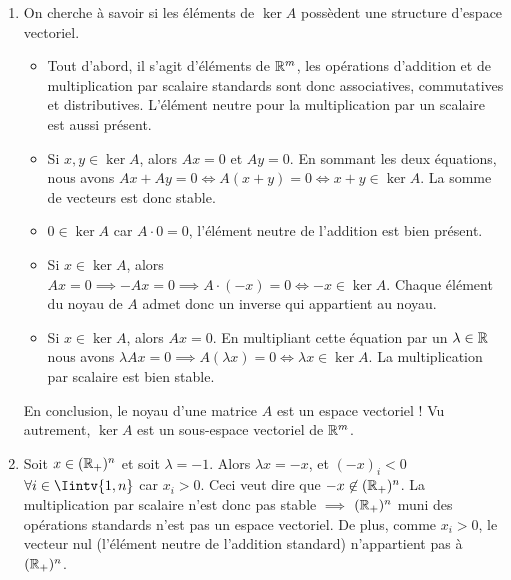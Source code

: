 \begin{exercice}
\begin{enumerate}
    \item On cherche à savoir si les éléments de $\ker A$ possèdent une structure d'espace vectoriel.
    \begin{itemize}
        \item Tout d'abord, il s'agit d'éléments de $\mathbb{R}^m$, les opérations d'addition et de multiplication par scalaire standards sont donc associatives, commutatives et distributives. L'élément neutre pour la multiplication par un scalaire est aussi présent.
        \item Si $x,y \in \ker A$, alors $Ax=0$ et $Ay = 0$. En sommant les deux équations, nous avons $Ax + Ay = 0 \iff A(x+y) = 0 \iff x+y \in \ker A$. La somme de vecteurs est donc stable.
        \item $0 \in \ker A$ car $A\cdot 0 = 0$, l'élément neutre de l'addition est bien présent.
        \item Si $x \in \ker A$, alors $Ax = 0 \implies -Ax = 0 \implies A \cdot (-x) = 0 \iff -x \in \ker A$. Chaque élément du noyau de $A$ admet donc un inverse qui appartient au noyau.
        \item Si $x \in \ker A$, alors $Ax=0$. En multipliant cette équation par un $\lambda \in \mathbb{R}$ nous avons $\lambda Ax = 0 \implies A(\lambda x) = 0 \iff \lambda x \in \ker A$. La multiplication par scalaire est bien stable.
    \end{itemize}
    En conclusion, le noyau d'une matrice $A$ est un espace vectoriel ! Vu autrement, $\ker A$ est un sous-espace vectoriel de $\mathbb{R}^m$.
    
    \item Soit $x \in (\mathbb{R}_+)^n$ et soit $\lambda = -1$. Alors $\lambda x = -x$, et $(-x)_i < 0$ $\forall i \in \Iintv{1,n}$ car $x_i > 0$. Ceci veut dire que $-x \not\in (\mathbb{R}_+)^n$. La multiplication par scalaire n'est donc pas stable $\implies$ $(\mathbb{R}_+)^n$ muni des opérations standards n'est pas un espace vectoriel. De plus, comme $x_i > 0$, le vecteur nul (l'élément neutre de l'addition standard) n'appartient pas à $(\mathbb{R}_+)^n$.
    

\end{enumerate}
\end{exercice}
